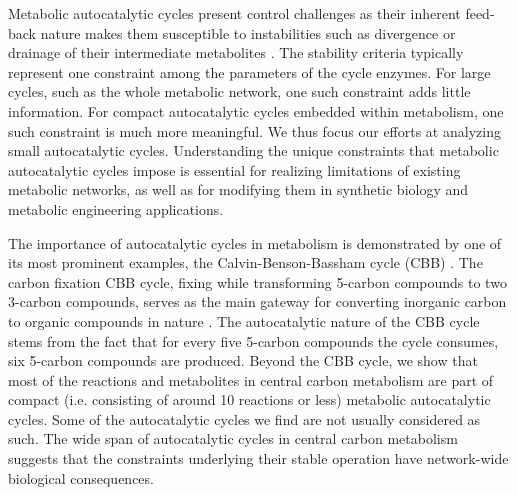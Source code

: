     Metabolic autocatalytic cycles present control challenges as their inherent feed-back nature makes them susceptible to instabilities such as divergence or drainage of their intermediate metabolites \cite{Teusink1998-he,Fell1999,Reznik2010-te}.
    The stability criteria typically represent one constraint among the parameters of the cycle enzymes.
    For large cycles, such as the whole metabolic network, one such constraint adds little information.
    For compact autocatalytic cycles embedded within metabolism, one such constraint is much more meaningful.
    We thus focus our efforts at analyzing small autocatalytic cycles.
    Understanding the unique constraints that metabolic autocatalytic cycles impose is essential for realizing limitations of existing metabolic networks, as well as for modifying them in synthetic biology and metabolic engineering applications.

    The importance of autocatalytic cycles in metabolism is demonstrated by one of its most prominent examples, the Calvin-Benson-Bassham cycle (CBB) \cite{Benson1950-cl}.
    The carbon fixation CBB cycle, fixing  while transforming 5-carbon compounds to two 3-carbon compounds, serves as the main gateway for converting inorganic carbon to organic compounds in nature \cite{Raven2012-le}.
    The autocatalytic nature of the CBB cycle stems from the fact that for every five 5-carbon compounds the cycle consumes, six 5-carbon compounds are produced.
    Beyond the CBB cycle, we show that most of the reactions and metabolites in central carbon metabolism are part of compact (i.e. consisting of around 10 reactions or less) metabolic autocatalytic cycles.
    Some of the autocatalytic cycles we find are not usually considered as such.
    The wide span of autocatalytic cycles in central carbon metabolism suggests that the constraints underlying their stable operation have network-wide biological consequences.

